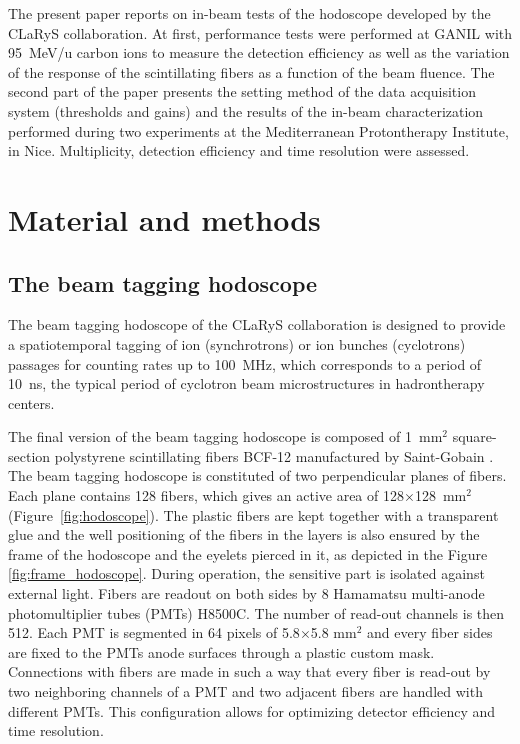 \documentclass[a4paper,11pt]{article}
\begin{document}
The present paper reports on in-beam tests of the hodoscope developed by the CLaRyS collaboration. At first, performance tests were performed at GANIL with 95~MeV/u carbon ions to measure the detection efficiency as well as the variation of the response of the scintillating fibers as a function of the beam fluence. The second part of the paper presents the setting method of the data acquisition system (thresholds and gains) and the results of the in-beam characterization performed during two experiments at the Mediterranean Protontherapy Institute, in Nice. Multiplicity, detection efficiency and time resolution were assessed. 

\section{Material and methods}
\subsection{The beam tagging hodoscope}
\label{sec:hodo}

The beam tagging hodoscope of the CLaRyS collaboration is designed to provide a spatiotemporal tagging of ion (synchrotrons) or ion bunches (cyclotrons) passages for counting rates up to 100~MHz, which corresponds to a period of 10~ns, the typical period of cyclotron beam microstructures in hadrontherapy centers. 

The final version of the beam tagging hodoscope is composed  of 1~mm$^{2}$ square-section polystyrene scintillating fibers BCF-12 manufactured by Saint-Gobain \cite{SaintGobain2017}.
The beam tagging hodoscope is constituted of two perpendicular planes of fibers. Each plane contains 128 fibers, which gives an active area of 128$\times$128~mm$^{2}$ (Figure~\ref{fig:hodoscope}). The plastic fibers are kept together with a transparent glue and the well positioning of the fibers in the layers is also ensured by the frame of the hodoscope and the eyelets pierced in it, as depicted in the Figure \ref{fig:frame_hodoscope}. During operation, the sensitive part is isolated against external light. Fibers are readout on both sides by 8 Hamamatsu multi-anode photomultiplier tubes (PMTs) H8500C. The number of read-out channels is then 512. Each PMT is segmented in 64 pixels of 5.8$\times$5.8 mm$^2$ and every fiber sides are fixed to the PMTs anode surfaces through a plastic custom mask. Connections with fibers are made in such a way that every fiber is read-out by two neighboring channels of a PMT and two adjacent fibers are handled with different PMTs. This configuration allows for optimizing detector efficiency and time resolution. 
\end{document}
